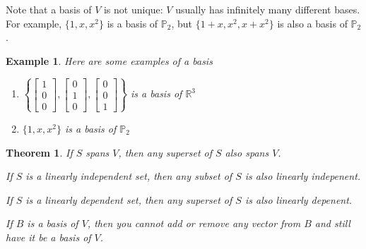 \documentclass[11pt]{article}
\newtheorem{thm}{Theorem}
\newtheorem{ex}{Example}
\begin{document}
Note that a basis of $V$ is not unique: $V$ usually has infinitely many different bases.
For example, $\{1,x,x^{2}\}$ is a basis of $\mathbb{P}_{2}$, but $\{1 + x, x^{2}, x + x^{2}\}$ is also a basis of $\mathbb{P}_{2}$.
\begin{ex}
  Here are some examples of a basis
  \begin{enumerate}
    \item $\left\{\begin{bmatrix} 1 \\ 0 \\ 0 \end{bmatrix}, \begin{bmatrix} 0 \\ 1 \\ 0 \end{bmatrix}, \begin{bmatrix} 0 \\ 0 \\ 1 \end{bmatrix}\right\}$ is a basis of $\mathbb{R}^{3}$
    \item $\{1, x, x^{2}\}$ is a basis of $\mathbb{P}_{2}$

  \end{enumerate}
\end{ex}

\begin{thm}
  If $S$ spans $V$, then any superset of $S$ also spans $V$.

  If $S$ is a linearly independent set, then any subset of $S$ is also linearly indepenent.

  If $S$ is a linearly dependent set, then any superset of $S$ is also linearly depenent.

  If $B$ is a basis of $V$, then you cannot add or remove any vector from $B$ and still have it be a basis of $V$.
\end{thm}
\end{document}
